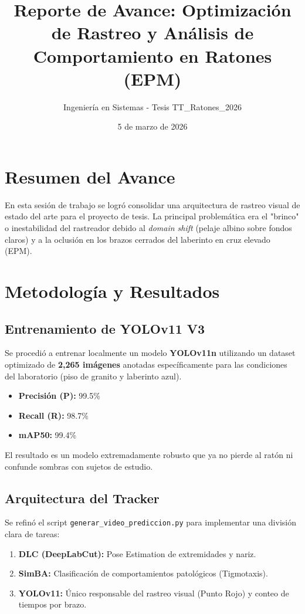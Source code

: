 \documentclass[12pt,a4paper]{article}
\title{\textbf{Reporte de Avance: Optimización de Rastreo y Análisis de Comportamiento en Ratones (EPM)}}
\author{Ingeniería en Sistemas - Tesis TT\_Ratones\_2026}
\date{5 de marzo de 2026}
\begin{document}
\maketitle

\section{Resumen del Avance}
En esta sesión de trabajo se logró consolidar una arquitectura de rastreo visual de estado del arte para el proyecto de tesis. La principal problemática era el "brinco" o inestabilidad del rastreador debido al \textit{domain shift} (pelaje albino sobre fondos claros) y a la oclusión en los brazos cerrados del laberinto en cruz elevado (EPM).

\section{Metodología y Resultados}

\subsection{Entrenamiento de YOLOv11 V3}
Se procedió a entrenar localmente un modelo \textbf{YOLOv11n} utilizando un dataset optimizado de \textbf{2,265 imágenes} anotadas específicamente para las condiciones del laboratorio (piso de granito y laberinto azul).
\begin{itemize}
    \item \textbf{Precisión (P):} 99.5\%
    \item \textbf{Recall (R):} 98.7\%
    \item \textbf{mAP50:} 99.4\%
\end{itemize}
El resultado es un modelo extremadamente robusto que ya no pierde al ratón ni confunde sombras con sujetos de estudio.

\subsection{Arquitectura del Tracker}
Se refinó el script \texttt{generar\_video\_prediccion.py} para implementar una división clara de tareas:
\begin{enumerate}
    \item \textbf{DLC (DeepLabCut):} Pose Estimation de extremidades y nariz.
    \item \textbf{SimBA:} Clasificación de comportamientos patológicos (Tigmotaxis).
    \item \textbf{YOLOv11:} Único responsable del rastreo visual (Punto Rojo) y conteo de tiempos por brazo.
\end{enumerate}
\end{document}
